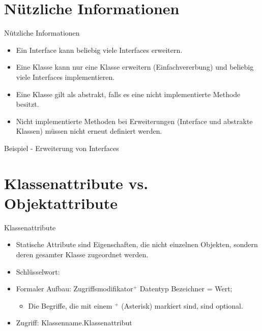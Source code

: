 \documentclass{../tuda-beamer}
\begin{document}
  \begin{frame}[c]
    
  \end{frame}


  \section{Nützliche Informationen}
  \begin{frame}{Nützliche Informationen}
    \begin{itemize}
      \item Ein Interface kann beliebig viele Interfaces erweitern.
      \item Eine Klasse kann nur eine Klasse erweitern (Einfachvererbung) und beliebig viele
      Interfaces implementieren.
      \item Eine Klasse gilt als abstrakt, falls es eine nicht implementierte Methode besitzt.
      \item Nicht implementierte Methoden bei Erweiterungen (Interface und abstrakte Klassen)
      müssen nicht erneut definiert werden.
    \end{itemize}
  \end{frame}

  \begin{frame}[c]{Beispiel - Erweiterung von Interfaces}
    
  \end{frame}

  \begin{frame}[c]
    
  \end{frame}


  \section{Klassenattribute vs. Objektattribute}
  \begin{frame}{Klassenattribute}
    \begin{itemize}
      \item Statische Attribute sind Eigenschaften, die nicht einzelnen Objekten, sondern deren
      gesamter Klasse zugeordnet werden.
      \item Schlüsselwort: 
      \item Formaler Aufbau: Zugriffsmodifikator\(^+\)  Datentyp Bezeichner =
      Wert;
      \begin{itemize}
        \item Die Begriffe, die mit einem \(^+\) (Asterisk) markiert sind, sind optional.
      \end{itemize}
      \item Zugriff: Klassenname.Klassenattribut
    \end{itemize}
  \end{frame}
\end{document}
